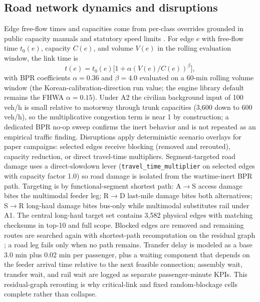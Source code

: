 \documentclass{ieeeaccess}
\begin{document}
\subsection{Road network dynamics and disruptions}
Edge free-flow times and capacities come from per-class overrides grounded in public capacity manuals and statutory speed limits \cite{b2,b3,b5,b16,b7}. For edge $e$ with free-flow time $t_0(e)$, capacity $C(e)$, and volume $V(e)$ in the rolling evaluation window, the link time is
\begin{equation}
t(e) = t_0(e)\bigl[1 + \alpha (V(e)/C(e))^{\beta}\bigr],
\label{eq:bpr}
\end{equation}
with BPR coefficients $\alpha=0.36$ and $\beta=4.0$ evaluated on a 60-min rolling volume window (the Korean-calibration-direction run value; the engine library default remains the FHWA $\alpha=0.15$). Under A2 the civilian background input of 100 veh/h is small relative to motorway through trunk capacities (3{,}600 down to 600 veh/h), so the multiplicative congestion term is near 1 by construction; a dedicated BPR no-op sweep confirms the inert behavior and is not repeated as an empirical traffic finding. Disruptions apply deterministic scenario overlays for paper campaigns: selected edges receive blocking (removed and rerouted), capacity reduction, or direct travel-time multipliers. Segment-targeted road damage uses a direct-slowdown lever (\texttt{travel\_\allowbreak time\_\allowbreak multiplier} on selected edges with capacity factor 1.0) so road damage is isolated from the wartime-inert BPR path. Targeting is by functional-segment shortest path: A$\rightarrow$S access damage bites the multimodal feeder leg; R$\rightarrow$D last-mile damage bites both alternatives; S$\rightarrow$R long-haul damage bites bus-only while multimodal substitutes rail under A1. The central long-haul target set contains 3{,}582 physical edges with matching checksums in top-10 and full scope. Blocked edges are removed and remaining routes are searched again with shortest-path recomputation on the residual graph \cite{b25}; a road leg fails only when no path remains. Transfer delay is modeled as a base 3.0 min plus 0.02 min per passenger, plus a waiting component that depends on the feeder arrival time relative to the next feasible connection; assembly wait, transfer wait, and rail wait are logged as separate passenger-minute KPIs. This residual-graph rerouting is why critical-link and fixed random-blockage cells complete rather than collapse.
\end{document}
